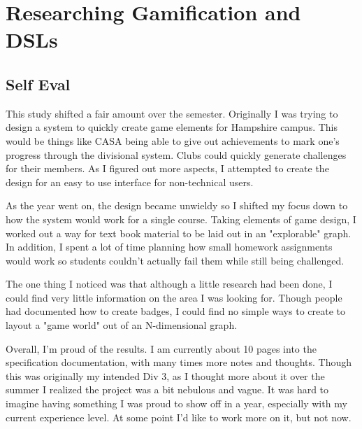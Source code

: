 \section{Researching Gamification and DSLs}

\begin{meta}
\end{meta}

\subsection*{Self Eval}
This study shifted a fair amount over the semester. Originally I
was trying to design a system to quickly create game elements for
Hampshire campus. This would be things like CASA being able to give
out achievements to mark one's progress through the divisional system.
Clubs could quickly generate challenges for their members. As I figured
out more aspects, I attempted to create the design for an easy to use
interface for non-technical users.

As the year went on, the design became unwieldy so I shifted my focus
down to how the system would work for a single course. Taking elements
of game design, I worked out a way for text book material to be laid out
in an "explorable" graph. In addition, I spent a lot of time planning
how small homework assignments would work so students couldn't actually
fail them while still being challenged.

The one thing I noticed was that although a little research had been
done, I could find very little information on the area I was looking
for. Though people had documented how to create badges, I could find no
simple ways to create to layout a "game world" out of an N-dimensional
graph.

Overall, I'm proud of the results. I am currently about 10 pages
into the specification documentation, with many times more notes and
thoughts. Though this was originally my intended Div 3, as I thought
more about it over the summer I realized the project was a bit nebulous
and vague. It was hard to imagine having something I was proud to show
off in a year, especially with my current experience level. At some
point I'd like to work more on it, but not now.

